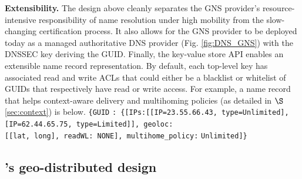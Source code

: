 {\bf{Extensibility.}} The design above cleanly separates the GNS provider's resource-intensive responsibility of name resolution under high mobility from the slow-changing certification process. It also allows for the GNS provider to be deployed today as a managed authoritative DNS provider (Fig. \ref{fig:DNS_GNS}) with the DNSSEC key deriving the GUID. Finally, the key-value store API enables an extensible name record representation. By default, each top-level key has associated read and write ACLs that could either be a blacklist or whitelist of GUIDs that respectively have read or write access. For example, a name record that helps context-aware delivery and multihoming policies (as detailed in $\S$\ref{sec:context}) is below.
\verb+{GUID+
\verb+: {[IPs:[[IP=23.55.66.43, type=Unlimited],+ \\
\verb+[IP=62.44.65.75, type=Limited]], geoloc:+\\
\verb+[[lat, long], readWL: NONE], multihome_policy:+
\verb+Unlimited]}+



\subsection{\auspice's geo-distributed design}

